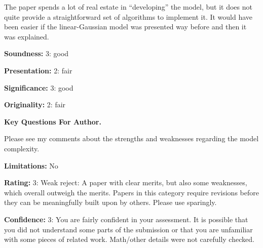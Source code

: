 The paper spends a lot of real estate in ``developing'' the model, but it does not quite provide a straightforward set of algorithms to implement it. It would have been easier if the linear-Gaussian model was presented way before and then it was explained.

\textbf{Soundness:} 3: good

\textbf{Presentation:} 2: fair

\textbf{Significance:} 3: good

\textbf{Originality:} 2: fair

\textbf{Key Questions For Author.}

Please see my comments about the strengths and weaknesses regarding the model complexity.

\textbf{Limitations:} No

\textbf{Rating:} 3: Weak reject: A paper with clear merits, but also some weaknesses, which overall outweigh the merits. Papers in this category require revisions before they can be meaningfully built upon by others. Please use sparingly.

\textbf{Confidence:} 3: You are fairly confident in your assessment. It is possible that you did not understand some parts of the submission or that you are unfamiliar with some pieces of related work. Math/other details were not carefully checked.

